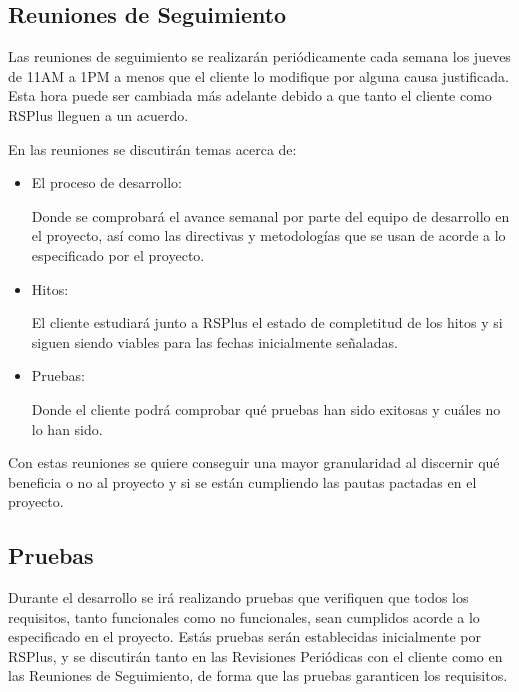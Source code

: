 \subsection{Reuniones de Seguimiento}
\par Las reuniones de seguimiento se realizarán periódicamente cada semana los jueves de 11AM a 1PM a menos que el cliente lo modifique por alguna causa justificada. Esta hora puede ser cambiada más adelante debido a que tanto el cliente como RSPlus lleguen a un acuerdo.

\par En las reuniones se discutirán temas acerca de:
\begin{itemize}[-]
  \item El proceso de desarrollo: \par Donde se comprobará el avance semanal por parte del equipo de desarrollo en el proyecto, así como las directivas y metodologías que se usan de acorde a lo especificado por el proyecto.
  \item Hitos: \par El cliente estudiará junto a RSPlus el estado de completitud de los hitos y si siguen siendo viables para las fechas inicialmente señaladas.
  \item Pruebas: \par Donde el cliente podrá comprobar qué pruebas han sido exitosas y cuáles no lo han sido.
\end{itemize}

\par Con estas reuniones se quiere conseguir una mayor granularidad al discernir qué beneficia o no al proyecto y si se están cumpliendo las pautas pactadas en el proyecto.

\subsection{Pruebas}
\par Durante el desarrollo se irá realizando pruebas que verifiquen que todos los requisitos, tanto funcionales como no funcionales, sean cumplidos acorde a lo especificado en el proyecto. Estás pruebas serán establecidas inicialmente por RSPlus, y se discutirán tanto en las Revisiones Periódicas con el cliente como en las Reuniones de Seguimiento, de forma que las pruebas garanticen los requisitos.
